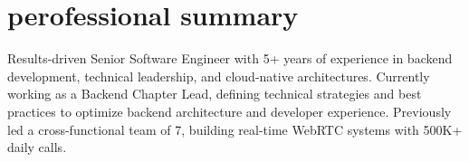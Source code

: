 \documentclass[a4paper]{article}
\begin{document}
\begin{minipage}[t]{0.65\textwidth}
  \preparetopsec
  \section{perofessional summary}
    \begin{justify}
      \begin{footnotesize}
Results-driven Senior Software Engineer with 5+ years of experience in backend 
development, technical leadership, and cloud-native architectures. Currently working
as a Backend Chapter Lead, defining technical strategies and best practices 
to optimize backend architecture and developer experience. Previously led a cross-functional 
team of 7, building real-time WebRTC systems with 500K+ daily calls.
      \end{footnotesize}
    \end{justify}
  \preparenormalsec

\end{minipage}
\end{document}
